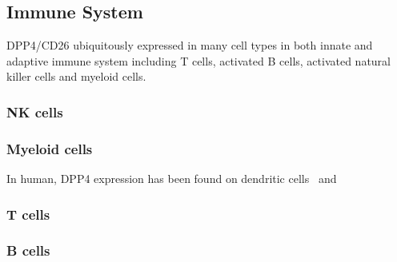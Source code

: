 \subsection{Immune System}
DPP4/CD26 ubiquitously expressed in many cell types in both innate and adaptive immune system including T cells, activated B cells, activated natural killer cells and myeloid cells.~\cite{Abbott1994,Shingu2003,Hong1989,Gutschmidt1981,Dikov2004,Bühling1995,Tanaka1992,Gorrell1991}  

\subsubsection{NK cells}

\subsubsection{Myeloid cells}
In human, DPP4 expression has been found on dendritic cells~\cite{Zhong2013,Gliddon2002,Epardaud2004} and 

\subsubsection{T cells}
\subsubsection{B cells}
